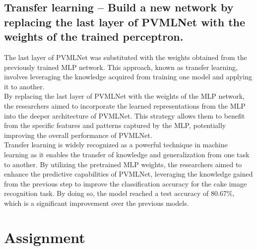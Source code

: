 \documentclass{class}
\begin{document}
\pagestyle{OtherPage}
\subsection{Transfer learning -- Build a new network by replacing the last layer of PVMLNet with the weights of the
    trained perceptron.}
The last layer of PVMLNet was substituted with the weights obtained from the previously trained MLP network.
This approach, known as transfer learning, involves leveraging the knowledge acquired from training one model and applying it to another.\\
By replacing the last layer of PVMLNet with the weights of the MLP network, the researchers aimed to incorporate the learned representations
from the MLP into the deeper architecture of PVMLNet.
This strategy allows them to benefit from the specific features and patterns captured by the MLP, potentially improving the overall performance of PVMLNet.\\
Transfer learning is widely recognized as a powerful technique in machine learning as it enables the transfer of knowledge and generalization from one task to another.
By utilizing the pretrained MLP weights, the researchers aimed to enhance the predictive capabilities of PVMLNet,
leveraging the knowledge gained from the previous step to improve the classification accuracy for the cake image recognition task.
By doing so, the model reached a test accuracy of 80.67\%, which is a significant improvement over the previous models.

\section{Assignment}
\end{document}
